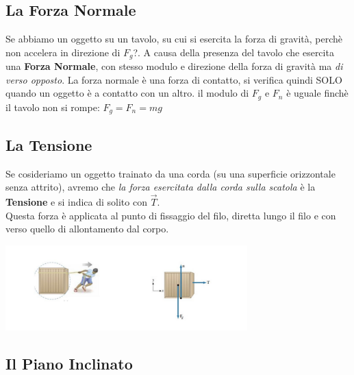 \documentclass[12pt, a4paper, openany]{book}
\begin{document}
\subsection{La Forza Normale}
Se abbiamo un oggetto su un tavolo, su cui si esercita la forza di gravità, perchè non accelera in direzione di $F_g$?.
A causa della presenza del tavolo che esercita una \textbf{Forza Normale}, con stesso modulo e direzione della forza di gravità ma \emph{di verso opposto}.
La forza normale è una forza di contatto, si verifica quindi SOLO quando un oggetto è a contatto con un altro.
il modulo di $F_g$ e $F_n$ è uguale finchè il tavolo non si rompe: $F_g = F_n = mg$
\subsection{La Tensione}
Se cosideriamo un oggetto trainato da una corda (su una superficie orizzontale senza attrito), avremo che \emph{la forza esercitata dalla corda sulla scatola} è la \textbf{Tensione}
e si indica di solito con $\overrightarrow{T}$.\\
Questa forza è applicata al punto di fissaggio del filo, diretta lungo il filo e con verso quello di allontamento dal corpo.
\begin{center}
    \includegraphics[width=0.7\textwidth]{Tensione.jpg}
\end{center}
\subsection{Il Piano Inclinato}
\end{document}
